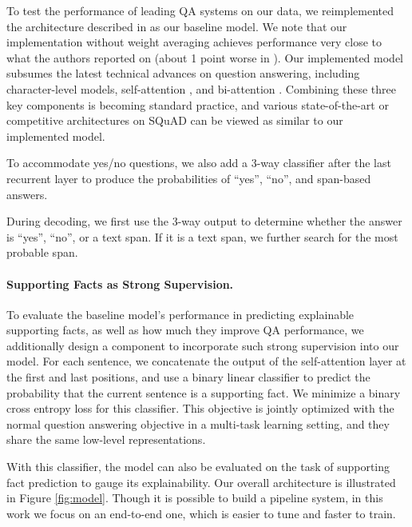 To test the performance of leading QA systems on our data, we reimplemented the architecture described in \citet{clark2017simple} as our baseline model. We note that our implementation without weight averaging achieves performance very close to what the authors reported on \squad{} (about 1 point worse in \fone{}). Our implemented model subsumes the latest technical advances on question answering, including character-level models, self-attention \cite{wang2017gated}, and bi-attention \cite{seo2016bidirectional}. Combining these three key components is becoming standard practice, and various state-of-the-art or competitive architectures \cite{liu2017stochastic,clark2017simple,wang2017gated,seo2016bidirectional,pan2017memen,salant2017contextualized,xiong2017dcn+} on SQuAD can be viewed as similar to our implemented model.

To accommodate yes/no questions, we also add a 3-way classifier after the last recurrent layer to produce the probabilities of ``yes'', ``no'', and span-based answers.

During decoding, we first use the 3-way output to determine whether the answer is ``yes'', ``no'', or a text span. If it is a text span, we further search for the most probable span.

\paragraph{Supporting Facts as Strong Supervision.} To evaluate the baseline model's performance in predicting explainable supporting facts, as well as how much they improve QA performance, we additionally design a component to incorporate such strong supervision into our model. For each sentence, we concatenate the output of the self-attention layer at the first and last positions, and use a binary linear classifier to predict the probability that the current sentence is a supporting fact. We minimize a binary cross entropy loss for this classifier. This objective is jointly optimized with the normal question answering objective in a multi-task learning setting, and they share the same low-level representations.

With this classifier, the model can also be evaluated on the task of supporting fact prediction to gauge its explainability. Our overall architecture is illustrated in Figure \ref{fig:model}.
Though it is possible to build a pipeline system, in this work we focus on an end-to-end one, which is easier to tune and faster to train.

